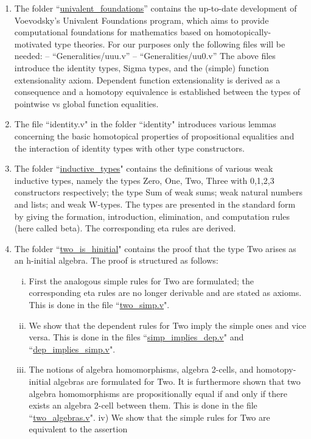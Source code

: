 \documentclass{article}
\theoremstyle{remark}
\theoremstyle{definition}
\begin{document}
\begin{enumerate}[1)]
\item The folder ``\url{univalent_foundations}'' contains the up-to-date development
   of Voevodsky's Univalent Foundations program, which aims to provide
   computational foundations for mathematics based on homotopically-motivated
   type theories. For our purposes only the following files will be needed:
        -- ``Generalities/uuu.v''
        -- ``Generalities/uu0.v''
   The above files introduce the identity types, Sigma types, and the (simple) function
   extensionality axiom. Dependent function extensionality is derived as a consequence
   and a homotopy equivalence is established between the types of pointwise vs global
   function equalities.
  \item The file ``identity.v" in the folder ``identity" introduces various lemmas concerning
   the basic homotopical properties of propositional equalities and the interaction
   of identity types with other type constructors.
     \item The folder ``\url{inductive_types}" contains the definitions of various weak inductive
   types, namely the types Zero, One, Two, Three with 0,1,2,3 constructors respectively;
   the type Sum of weak sums; weak natural numbers and lists; and weak W-types.
   The types are presented in the standard form by giving the formation, introduction,
   elimination, and computation rules (here called beta). The corresponding eta rules
   are derived.
\item The folder ``\url{two_is_hinitial}" contains the proof that the type Two arises as an
   h-initial algebra. The proof is structured as follows:
   \begin{enumerate}[i)]
         \item First the analogous simple rules for Two are formulated; the corresponding
eta rules are no longer derivable and are stated as axioms. This is done
in the file ``\url{two_simp.v}".
\item We show that the dependent rules for Two imply the simple ones and
vice versa. This is done in the files ``\url{simp_implies_dep.v}" and
``\url{dep_implies_simp.v}".
\item The notions of algebra homomorphisms, algebra 2-cells, and homotopy-initial
algebras are formulated for Two. It is furthermore shown that two algebra
homomorphisms are propositionally equal if and only if there exists an
algebra 2-cell between them. This is done in the file ``\url{two_algebras.v}".
iv) We show that the simple rules for Two are equivalent to the assertion

\end{enumerate}
\end{enumerate}
\end{document}
